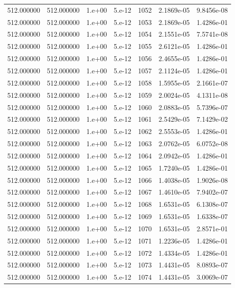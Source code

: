 \begin{table}[htbp]
\begin{tabular}{rrrrrrr}
512.000000 & 512.000000 & 1.e+00 & 5.e-12 & 1052 & 2.1869e-05 & 9.8456e-08 \\
512.000000 & 512.000000 & 1.e+00 & 5.e-12 & 1053 & 2.1869e-05 & 1.4286e-01 \\
512.000000 & 512.000000 & 1.e+00 & 5.e-12 & 1054 & 2.1551e-05 & 7.5741e-08 \\
512.000000 & 512.000000 & 1.e+00 & 5.e-12 & 1055 & 2.6121e-05 & 1.4286e-01 \\
512.000000 & 512.000000 & 1.e+00 & 5.e-12 & 1056 & 2.4655e-05 & 1.4286e-01 \\
512.000000 & 512.000000 & 1.e+00 & 5.e-12 & 1057 & 2.1124e-05 & 1.4286e-01 \\
512.000000 & 512.000000 & 1.e+00 & 5.e-12 & 1058 & 1.5955e-05 & 2.1661e-07 \\
512.000000 & 512.000000 & 1.e+00 & 5.e-12 & 1059 & 2.0024e-05 & 4.1311e-08 \\
512.000000 & 512.000000 & 1.e+00 & 5.e-12 & 1060 & 2.0883e-05 & 5.7396e-07 \\
512.000000 & 512.000000 & 1.e+00 & 5.e-12 & 1061 & 2.5429e-05 & 7.1429e-02 \\
512.000000 & 512.000000 & 1.e+00 & 5.e-12 & 1062 & 2.5553e-05 & 1.4286e-01 \\
512.000000 & 512.000000 & 1.e+00 & 5.e-12 & 1063 & 2.0762e-05 & 6.0752e-08 \\
512.000000 & 512.000000 & 1.e+00 & 5.e-12 & 1064 & 2.0942e-05 & 1.4286e-01 \\
512.000000 & 512.000000 & 1.e+00 & 5.e-12 & 1065 & 1.7240e-05 & 1.4286e-01 \\
512.000000 & 512.000000 & 1.e+00 & 5.e-12 & 1066 & 1.4038e-05 & 1.9026e-08 \\
512.000000 & 512.000000 & 1.e+00 & 5.e-12 & 1067 & 1.4610e-05 & 7.9402e-07 \\
512.000000 & 512.000000 & 1.e+00 & 5.e-12 & 1068 & 1.6531e-05 & 6.1308e-07 \\
512.000000 & 512.000000 & 1.e+00 & 5.e-12 & 1069 & 1.6531e-05 & 1.6338e-07 \\
512.000000 & 512.000000 & 1.e+00 & 5.e-12 & 1070 & 1.6531e-05 & 2.8571e-01 \\
512.000000 & 512.000000 & 1.e+00 & 5.e-12 & 1071 & 1.2236e-05 & 1.4286e-01 \\
512.000000 & 512.000000 & 1.e+00 & 5.e-12 & 1072 & 1.4334e-05 & 1.4286e-01 \\
512.000000 & 512.000000 & 1.e+00 & 5.e-12 & 1073 & 1.4431e-05 & 8.0893e-07 \\
512.000000 & 512.000000 & 1.e+00 & 5.e-12 & 1074 & 1.4431e-05 & 3.0069e-07 \\

\end{tabular}
\end{table}
